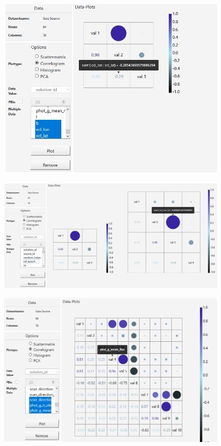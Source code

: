 \documentclass{article}
\begin{document}
\begin{figure}[!h]
\centering
\includegraphics[width=1\textwidth]{images/m3/corr1.PNG}
\label{fig7}
\end{figure}

\begin{figure}[!h]
\centering
\includegraphics[width=1\textwidth]{images/m3/corr2.PNG}
\label{fig8}
\end{figure}

\begin{figure}[!h]
\centering
\includegraphics[width=1\textwidth]{images/m3/corr3.PNG}
\label{fig9}
\end{figure}
\newpage
\end{document}
